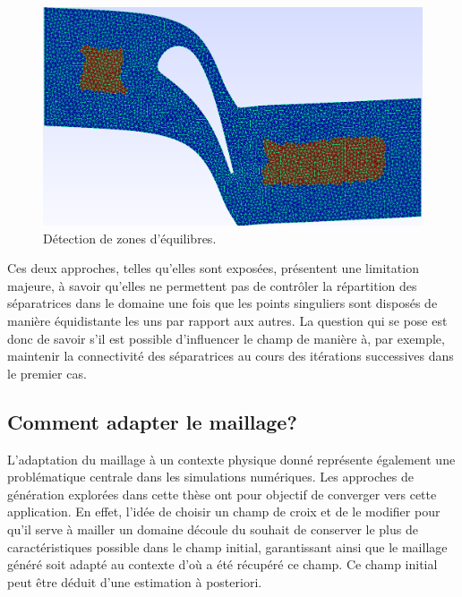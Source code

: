 \begin{figure}[h!]
\centering
\includegraphics[scale=0.35]{images/coloriage.png}
\caption{Détection de zones d'équilibres.}
\label{fig:coloriage}
\end{figure}
Ces deux approches, telles qu'elles sont exposées, présentent une limitation majeure, à savoir qu'elles ne permettent pas de contrôler la répartition des séparatrices dans le domaine une fois que les points singuliers sont disposés de manière équidistante les uns par rapport aux autres. La question qui se pose est donc de savoir s'il est possible d'influencer le champ de manière à, par exemple, maintenir la connectivité des séparatrices au cours des itérations successives dans le premier cas.


\subsection*{Comment adapter le maillage?}

L'adaptation du maillage à un contexte physique donné représente également une problématique centrale dans les simulations numériques. Les approches de génération explorées dans cette thèse ont pour objectif de converger vers cette application. En effet, l'idée de choisir un champ de croix et de le modifier pour qu'il serve à mailler un domaine découle du souhait de conserver le plus de caractéristiques possible dans le champ initial, garantissant ainsi que le maillage généré soit adapté au contexte d'où a été récupéré ce champ. Ce champ initial peut être déduit d'une estimation à posteriori.

